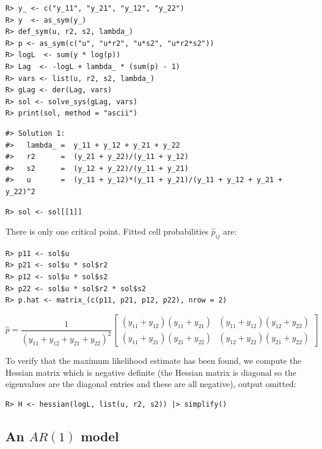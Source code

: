 \begin{verbatim}
R> y_ <- c("y_11", "y_21", "y_12", "y_22")
R> y  <- as_sym(y_)
R> def_sym(u, r2, s2, lambda_)
R> p <- as_sym(c("u", "u*r2", "u*s2", "u*r2*s2"))
R> logL  <- sum(y * log(p))
R> Lag  <- -logL + lambda_ * (sum(p) - 1) 
R> vars <- list(u, r2, s2, lambda_)
R> gLag <- der(Lag, vars)
R> sol <- solve_sys(gLag, vars)
R> print(sol, method = "ascii")
\end{verbatim}

\begin{verbatim}
#> Solution 1:
#>   lambda_ =  y_11 + y_12 + y_21 + y_22 
#>   r2      =  (y_21 + y_22)/(y_11 + y_12) 
#>   s2      =  (y_12 + y_22)/(y_11 + y_21) 
#>   u       =  (y_11 + y_12)*(y_11 + y_21)/(y_11 + y_12 + y_21 + y_22)^2
\end{verbatim}

\begin{verbatim}
R> sol <- sol[[1]]
\end{verbatim}

There is only one critical point. Fitted cell probabilities \(\hat p_{ij}\) are:

\begin{verbatim}
R> p11 <- sol$u
R> p21 <- sol$u * sol$r2
R> p12 <- sol$u * sol$s2
R> p22 <- sol$u * sol$r2 * sol$s2
R> p.hat <- matrix_(c(p11, p21, p12, p22), nrow = 2)
\end{verbatim}

\[
\hat p = \frac{1}{\left(y_{11} + y_{12} + y_{21} + y_{22}\right)^{2}}  \left[\begin{matrix}\left(y_{11} + y_{12}\right) \left(y_{11} + y_{21}\right) & \left(y_{11} + y_{12}\right) \left(y_{12} + y_{22}\right)\\\left(y_{11} + y_{21}\right) \left(y_{21} + y_{22}\right) & \left(y_{12} + y_{22}\right) \left(y_{21} + y_{22}\right)\end{matrix}\right]
\]

To verify that the maximum likelihood estimate has been found, we compute the Hessian matrix
which is negative definite (the Hessian matrix is diagonal so the eigenvalues are the diagonal entries and these are all negative), output omitted:

\begin{verbatim}
R> H <- hessian(logL, list(u, r2, s2)) |> simplify()
\end{verbatim}

\hypertarget{an-ar1-model}{%
\subsection{\texorpdfstring{An \(AR(1)\) model}{An AR(1) model}}\label{an-ar1-model}}

